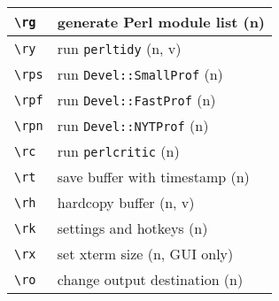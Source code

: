 \documentclass[oneside,10pt,landscape,DIV17]{scrartcl}
\begin{document}
\begin{multicols}{3}
\begin{center}
\begin{tabular}[]{|p{11mm}|p{58mm}|}
\hline \verb'\rg'    & generate Perl module list            \hfill (n)   \\
\hline \verb'\ry'    & run \verb'perltidy'                  \hfill (n, v)\\
\hline \verb'\rps'   & run \verb'Devel::SmallProf'          \hfill (n)   \\
\hline \verb'\rpf'   & run \verb'Devel::FastProf'           \hfill (n)   \\
\hline \verb'\rpn'   & run \verb'Devel::NYTProf'            \hfill (n)   \\
\hline \verb'\rc'    & run \verb'perlcritic'                \hfill (n)   \\
\hline \verb'\rt'    & save buffer with timestamp           \hfill (n)   \\
\hline \verb'\rh'    & hardcopy buffer                      \hfill (n, v)\\
\hline \verb'\rk'    & settings and hotkeys                 \hfill (n)   \\
\hline \verb'\rx'    & set xterm size                       \hfill (n, {\tiny GUI only})\\
\hline \verb'\ro'    & change output destination            \hfill (n)   \\
\hline
\end{tabular}%
%
\end{center}%
\end{multicols}%
\newpage
%
%
\end{document}
